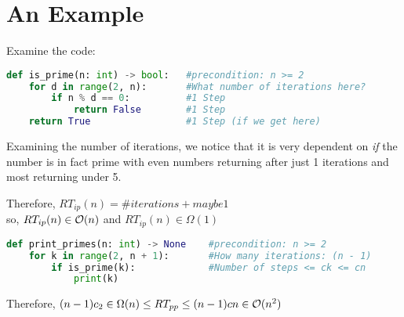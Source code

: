 \documentclass[12pt, letterpaper, twoside]{article}
\begin{document}

\section{An Example}
Examine the code:
\begin{lstlisting}[language=Python]
def is_prime(n: int) -> bool:   #precondition: n >= 2
    for d in range(2, n):       #What number of iterations here?
        if n % d == 0:          #1 Step
            return False        #1 Step
    return True                 #1 Step (if we get here)
\end{lstlisting}

Examining the number of iterations, we notice that it is very dependent on \emph{if} the number is in fact prime
with even numbers returning after just 1 iterations and most returning under 5.

Therefore, $RT_{ip}(n) = \#iterations + maybe 1$\\
so, $RT_{ip}(n) \in \mathcal O(n)$ and $RT_{ip}(n) \in \Omega(1)$

\begin{lstlisting}[language=Python]
def print_primes(n: int) -> None    #precondition: n >= 2
    for k in range(2, n + 1):       #How many iterations: (n - 1)
        if is_prime(k):             #Number of steps <= ck <= cn
            print(k)
\end{lstlisting}

Therefore, $(n - 1)c_2 \in \Omega(n) \le RT_{pp} \le (n - 1)cn \in \mathcal O(n^2)$
\end{document}
